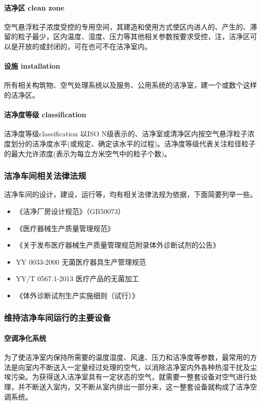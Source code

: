 \paragraph{洁净区 clean zone} 空气悬浮粒子浓度受控的专用空间，其建造和使用方式使区内进人的、产生的、滞留的粒子最少，区内温度、湿度、压力等其他相关参数按要求受控，注，洁净区可以是开放的或封闭的，可在也可不在洁净室内。

\paragraph{设施 installation} 所有相关构筑物、空气处理系统以及服务、公用系统的洁净室，建一个或数个这样的洁净区。

\paragraph{洁净度等级 classification} 洁净度等级classification 以ISO N级表示的、洁净室或清净区内按空气悬浮粒子浓度划分的洁净度水平(或规定、确定该水平的过程)。洁净度等级代表关注粒径粒子的最大允许浓度(表示为每立方米空气中的粒子个数)。

\subsubsection{洁净车间相关法律法规}

洁净车间的设计，建设，运行等，均有相关法律法规为依据，下面简要列举一些。
\begin{itemize}
    \item 《洁净厂房设计规范》（GB50073）
    \item 《医疗器械生产质量管理规范》
    \item 《关于发布医疗器械生产质量管理规范附录体外诊断试剂的公告》
    \item YY 0033-2000 无菌医疗器具生产管理规范
    \item YY/T 0567.1-2013 医疗产品的无菌加工
    \item 《体外诊断试剂生产实施细则（试行）》
\end{itemize}

\subsubsection{维持洁净车间运行的主要设备}

\paragraph{空调净化系统} 为了使洁净室内保持所需要的温度湿度、风速、压力和洁净度等参数，最常用的方法是向室内不断送入一定量经过处理的空气，以消除洁净室内外各种热湿干扰及尘埃污染。为获得送入洁净室具有一定状态的空气，就需要一整套设备对空气进行处理，并不断送入室内，又不断从室内排出一部分来，这一整套设备就构成了洁净空调系统。

